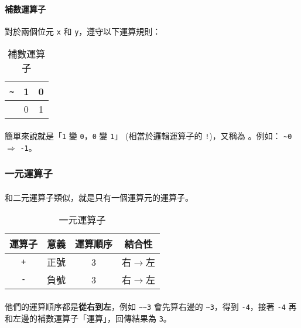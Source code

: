 \documentclass[12pt,a4paper,oneside]{article}
\begin{document}
\begin{CJK}{UTF8}{bkai}
\paragraph{補數運算子}對於兩個位元 \lstinline!x! 和 \lstinline!y!，遵守以下運算規則：

\begin{table}[h!]
\centering
\begin{tabular}{|c||c|c|}
\hline
\lstinline!~! & \textbf{1} & \textbf{0}\\
\hline
 & 0         & 1\\
\hline
\end{tabular}
\caption{補數運算子}
\label{basic:cpp:table:operator:complement}
\end{table}

\paragraph{}簡單來說就是「\lstinline!1! 變 \lstinline!0!，\lstinline!0! 變 \lstinline!1!」 (相當於邏輯運算子的 \lstinline"!")，又稱為 。例如： \lstinline!~0! $\Rightarrow$ \lstinline!-1!。

\subsubsection{一元運算子}

\paragraph{}和二元運算子類似，就是只有一個運算元的運算子。
\begin{table}[h!]
\centering
\begin{tabular}{|c|c|c|c|}
\hline
運算子 & 意義 & 運算順序 & 結合性\\
\hline
\lstinline!+! & 正號 & 3 & 右$\rightarrow$左\\
\hline
\lstinline!-! & 負號 & 3 & 右$\rightarrow$左\\
\hline
\end{tabular}
\caption{一元運算子}
\label{basic:cpp:table:operator:uniary}
\end{table}

\paragraph{}他們的運算順序都是\textbf{從右到左}，例如 \lstinline!~~3! 會先算右邊的 \lstinline!~3!，得到 \lstinline!-4!，接著 \lstinline!-4! 再和左邊的補數運算子「運算」，回傳結果為 \lstinline!3!。


\end{CJK}
\end{document}
